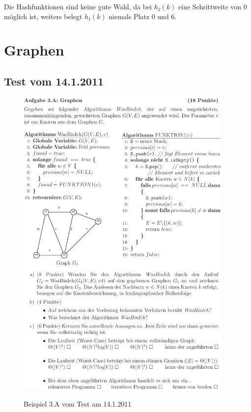 \documentclass[a4paper, 12pt]{article}
\begin{document}
Die Hashfunktionen sind keine gute Wahl, da bei $h₂\left(k\right)$ eine
Schrittweite von 0 möglich ist, weiters belegt $h₁\left(k\right)$ niemals
Platz 0 und 6.

\section{Graphen}

\subsection{Test vom 14.1.2011}

\begin{figure}[htbp]
	\caption{Beispiel 3.A vom Test am 14.1.2011}
	\vskip 0.2cm
	\centering
	\includegraphics[width=0.95\textwidth]{Figures/Test_2011-01-14_3A}
	\label{figure:Test_2011-01-14_3A}
\end{figure}
\end{document}
